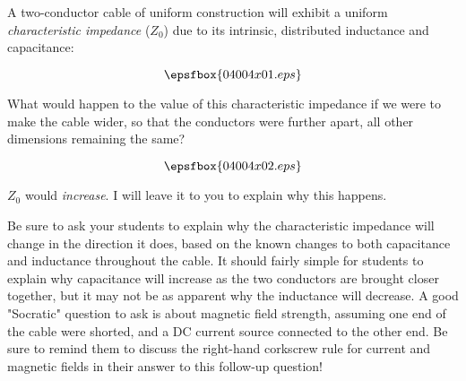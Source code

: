

A two-conductor cable of uniform construction will exhibit a uniform {\it characteristic impedance} ($Z_0$) due to its intrinsic, distributed inductance and capacitance:

$$\epsfbox{04004x01.eps}$$

What would happen to the value of this characteristic impedance if we were to make the cable wider, so that the conductors were further apart, all other dimensions remaining the same?

$$\epsfbox{04004x02.eps}$$







$Z_0$ would {\it increase}.  I will leave it to you to explain why this happens.







Be sure to ask your students to explain why the characteristic impedance will change in the direction it does, based on the known changes to both capacitance and inductance throughout the cable.  It should fairly simple for students to explain why capacitance will increase as the two conductors are brought closer together, but it may not be as apparent why the inductance will decrease.  A good "Socratic" question to ask is about magnetic field strength, assuming one end of the cable were shorted, and a DC current source connected to the other end.  Be sure to remind them to discuss the right-hand corkscrew rule for current and magnetic fields in their answer to this follow-up question!





